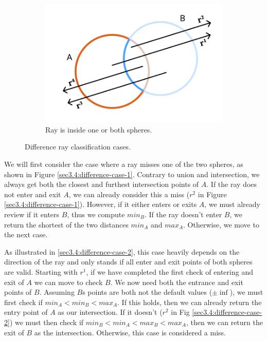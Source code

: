 \documentclass[a4paper,11pt,oneside]{article}
\begin{document}
\begin{figure}[ht]
\begin{subfigure}[b]{0.3\textwidth}
         \includegraphics[width=\textwidth]{section3/3.4/difference-case-3.png}
         \caption{Ray is inside one or both spheres.}
         \label{sec3.4:difference-case-3}
     \end{subfigure}
        \caption{Difference ray classification cases.}
        \label{sec3.4:sphere-difference}
\end{figure}


We will first consider the case where a ray misses one of the two spheres, as shown in Figure \ref{sec3.4:difference-case-1}.  
Contrary to union and intersection, we always get both the closest and furthest intersection points of $A$. If the ray does not enter and exit $A$, we can already consider this a miss ($r^2$ in Figure \ref{sec3.4:difference-case-1}). However, if it either enters or exits $A$, we must already review if it enters $B$, thus we compute $min_B$. If the ray doesn't enter $B$, we return the shortest of the two distances $min_A$ and $max_A$. Otherwise, we move to the next case.

As illustrated in \ref{sec3.4:difference-case-2}, this case heavily depends on the direction of the ray and only stands if all enter and exit points of both spheres are valid. Starting with $r^1$, if we have completed the first check of entering and exit of $A$ we can move to check $B$. We now need both the entrance and exit points of $B$. Assuming $B$s points are both not the default values ($\pm\inf$), we must first check if $min_A < min_B < max_A$. If this holds, then we can already return the entry point of $A$ as our intersection. If it doesn't ($r^2$ in Fig \ref{sec3.4:difference-case-2}) we must then check if $min_B < min_A < max_B < max_A$, then we can return the exit of $B$ as the intersection. Otherwise, this case is considered a miss.
\end{document}
